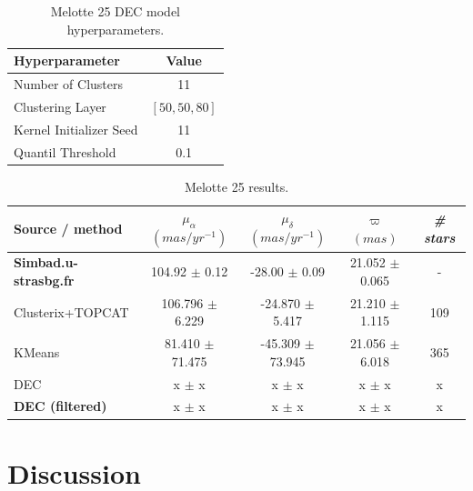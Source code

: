 \documentclass[11pt, a4paper, english]{book}
\begin{document}
\newpage

\vfill

\begin{table}[h!]
  \begin{center}
    \begin{tabular}{l|c}
      \textbf{Hyperparameter} & \textbf{Value} \\
      \hline
      Number of Clusters & 11 \\
      Clustering Layer & $\left[ 50, 50, 80 \right]$ \\
      Kernel Initializer Seed & 11 \\
      Quantil Threshold & 0.1 \\
    \end{tabular}
    \caption{Melotte 25 DEC model hyperparameters.}
    \label{tab:hyperparameters_melotte_25}
  \end{center}
\end{table}

\begin{table}[h!]
  \begin{center}
    \begin{tabular}{l|c|c|c|c}
      \textbf{Source / method} & \textbf{$\mu_{\alpha}$ $(mas/yr^{-1})$} & \textbf{$\mu_{\delta}$ $(mas/yr^{-1})$} & \textbf{$\varpi$ $(mas)$} & \emph{\# stars} \\
      \hline
      \textbf{Simbad.u-strasbg.fr} & 104.92 $\pm$ 0.12 & -28.00 $\pm$ 0.09 & 21.052 $\pm$ 0.065 & - \\
      Clusterix+TOPCAT & 106.796 $\pm$ 6.229 & -24.870 $\pm$ 5.417 & 21.210 $\pm$ 1.115 & 109 \\
      KMeans & 81.410 $\pm$ 71.475 & -45.309 $\pm$ 73.945 & 21.056 $\pm$ 6.018 & 365 \\
      DEC & x $\pm$ x & x $\pm$ x & x $\pm$ x & x \\
      \textbf{DEC (filtered)} & x $\pm$ x & x $\pm$ x & x $\pm$ x & x \\
    \end{tabular}
    \caption{Melotte 25 results.}
    \label{tab:results_melotte_25}
  \end{center}
\end{table}

\vfill

\newpage

\section{Discussion}
\end{document}
